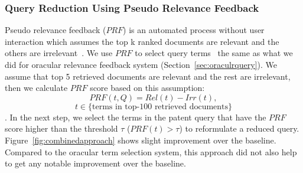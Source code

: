 \subsubsection{Query Reduction Using Pseudo Relevance Feedback}
Pseudo relevance feedback ($\mathit{PRF}$) is an automated process without user interaction which assumes the top k ranked documents are relevant and the others are irrelevant~\citep{Baeza-Yates2011}. We use $\mathit{PRF}$ to select query terms~\cite{maxwell2013compact} the same as what we did for oracular relevance feedback system (Section~\ref{sec:oraculrquery}). We assume that top 5 retrieved documents are relevant and the rest are irrelevant, then we calculate $\mathit{PRF}$ score based on this assumption:  
\begin{equation}
PRF(t,Q)=Rel(t)-Irr(t), 
 \label{eq:score}
\end{equation}
\vspace*{-2ex}
\begin{displaymath}t\in \lbrace \mbox{terms in top-100 retrieved documents}\rbrace\end{displaymath}.
In the next step, we select the terms in the patent query that have the $\mathit{PRF}$ score higher than the threshold $\tau$ ($PRF(t)>\tau$) to reformulate a reduced query. Figure~\ref{fig:combinedapproach} shows slight improvement over the baseline. Compared to the oracular term selection system, this approach did not also help to get any notable improvement over the baseline.
